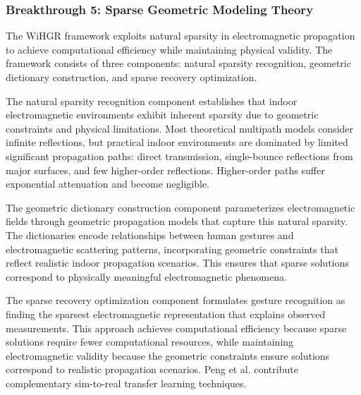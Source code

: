 \documentclass[journal]{IEEEtran}
\begin{document}
\subsubsection{Breakthrough 5: Sparse Geometric Modeling Theory}

The WiHGR framework \cite{meng2021wihgr} exploits natural sparsity in electromagnetic propagation to achieve computational efficiency while maintaining physical validity. The framework consists of three components: natural sparsity recognition, geometric dictionary construction, and sparse recovery optimization.

The natural sparsity recognition component establishes that indoor electromagnetic environments exhibit inherent sparsity due to geometric constraints and physical limitations. Most theoretical multipath models consider infinite reflections, but practical indoor environments are dominated by limited significant propagation paths: direct transmission, single-bounce reflections from major surfaces, and few higher-order reflections. Higher-order paths suffer exponential attenuation and become negligible.

The geometric dictionary construction component parameterizes electromagnetic fields through geometric propagation models that capture this natural sparsity. The dictionaries encode relationships between human gestures and electromagnetic scattering patterns, incorporating geometric constraints that reflect realistic indoor propagation scenarios. This ensures that sparse solutions correspond to physically meaningful electromagnetic phenomena.

The sparse recovery optimization component formulates gesture recognition as finding the sparsest electromagnetic representation that explains observed measurements. This approach achieves computational efficiency because sparse solutions require fewer computational resources, while maintaining electromagnetic validity because the geometric constraints ensure solutions correspond to realistic propagation scenarios. Peng et al. \cite{peng2018sim} contribute complementary sim-to-real transfer learning techniques.
\end{document}
